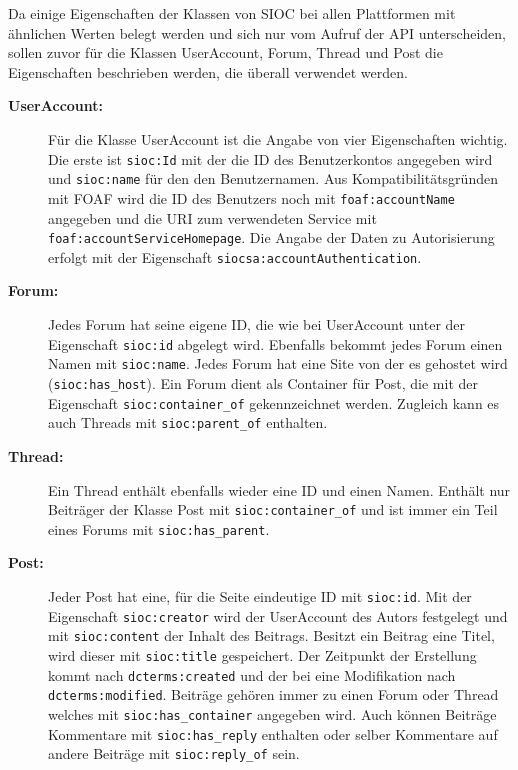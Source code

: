 Da einige Eigenschaften der Klassen von SIOC bei allen Plattformen mit ähnlichen Werten belegt werden und sich nur vom Aufruf der API unterscheiden, sollen zuvor für die Klassen UserAccount, Forum, Thread und Post die Eigenschaften beschrieben werden, die überall verwendet werden.

\begin{description}
    \item[\textbf{UserAccount:}]  Für die Klasse UserAccount ist die Angabe von vier Eigenschaften wichtig. Die erste ist \texttt{sioc:Id} mit der die ID des Benutzerkontos angegeben wird und \texttt{sioc:name} für den den Benutzernamen. Aus Kompatibilitätsgründen mit FOAF wird die ID des Benutzers noch mit \texttt{foaf:accountName} angegeben und die URI zum verwendeten Service mit \texttt{foaf:accountServiceHomepage}. Die Angabe der Daten zu Autorisierung erfolgt mit der Eigenschaft \texttt{siocsa:accountAuthentication}.

    \item[\textbf{Forum:}] Jedes Forum hat seine eigene ID, die wie bei UserAccount unter der Eigenschaft \texttt{sioc:id} abgelegt wird. Ebenfalls bekommt jedes Forum einen Namen mit \texttt{sioc:name}. Jedes Forum hat eine Site von der es gehostet wird (\texttt{sioc:has\_host}). Ein Forum dient als Container für Post, die mit der Eigenschaft \texttt{sioc:container\_of} gekennzeichnet werden. Zugleich kann es auch Threads mit \texttt{sioc:parent\_of} enthalten. 

    \item[\textbf{Thread:}] Ein Thread enthält ebenfalls wieder eine ID und einen Namen. Enthält nur Beiträger der Klasse Post mit \texttt{sioc:container\_of} und ist immer ein Teil eines Forums mit \texttt{sioc:has\_parent}.

    \item[\textbf{Post:}] Jeder Post hat eine, für die Seite eindeutige ID mit \texttt{sioc:id}. Mit der Eigenschaft \texttt{sioc:creator} wird der UserAccount des Autors festgelegt und mit \texttt{sioc:content} der Inhalt des Beitrags. Besitzt ein Beitrag eine Titel, wird dieser mit \texttt{sioc:title} gespeichert. Der Zeitpunkt der Erstellung kommt nach \texttt{dcterms:created} und der bei eine Modifikation nach \texttt{dcterms:modified}. Beiträge gehören immer zu einen Forum oder Thread welches mit \texttt{sioc:has\_container} angegeben wird. Auch können Beiträge Kommentare mit \texttt{sioc:has\_reply} enthalten oder selber Kommentare auf andere Beiträge mit \texttt{sioc:reply\_of} sein.
\end{description}

